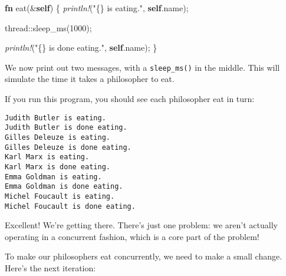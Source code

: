 \documentclass[a4paper,]{book}
\newenvironment{Shaded}{\begin{snugshade}}{\end{snugshade}}
\newcommand{\KeywordTok}[1]{\textcolor[rgb]{0.13,0.29,0.53}{\textbf{{#1}}}}
\newcommand{\DecValTok}[1]{\textcolor[rgb]{0.00,0.00,0.81}{{#1}}}
\newcommand{\StringTok}[1]{\textcolor[rgb]{0.31,0.60,0.02}{{#1}}}
\newcommand{\PreprocessorTok}[1]{\textcolor[rgb]{0.56,0.35,0.01}{\textit{{#1}}}}
\newcommand{\NormalTok}[1]{{#1}}
\begin{document}
\begin{Shaded}
\begin{Highlighting}[]
    \KeywordTok{fn} \NormalTok{eat(&}\KeywordTok{self}\NormalTok{) \{}
        \PreprocessorTok{println!}\NormalTok{(}\StringTok{"\{\} is eating."}\NormalTok{, }\KeywordTok{self}\NormalTok{.name);}

        \NormalTok{thread::sleep_ms(}\DecValTok{1000}\NormalTok{);}

        \PreprocessorTok{println!}\NormalTok{(}\StringTok{"\{\} is done eating."}\NormalTok{, }\KeywordTok{self}\NormalTok{.name);}
    \NormalTok{\}}
\end{Highlighting}
\end{Shaded}

We now print out two messages, with a \texttt{sleep\_ms()} in the
middle. This will simulate the time it takes a philosopher to eat.

If you run this program, you should see each philosopher eat in turn:

\begin{verbatim}
Judith Butler is eating.
Judith Butler is done eating.
Gilles Deleuze is eating.
Gilles Deleuze is done eating.
Karl Marx is eating.
Karl Marx is done eating.
Emma Goldman is eating.
Emma Goldman is done eating.
Michel Foucault is eating.
Michel Foucault is done eating.
\end{verbatim}

Excellent! We're getting there. There's just one problem: we aren't
actually operating in a concurrent fashion, which is a core part of the
problem!

To make our philosophers eat concurrently, we need to make a small
change. Here's the next iteration:
\end{document}
